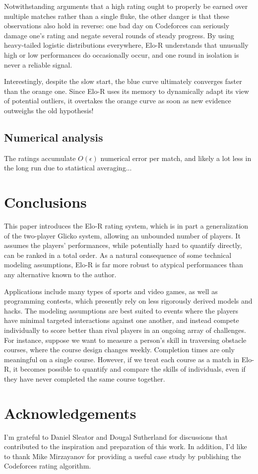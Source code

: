 \documentclass{article}
\begin{document}
Notwithstanding arguments that a high rating ought to properly be earned over multiple matches rather than a single fluke, the other danger is that these observations also hold in reverse: one bad day on Codeforces can seriously damage one's rating and negate several rounds of steady progress. By using heavy-tailed logistic distributions everywhere, Elo-R understands that unusually high or low performances do occasionally occur, and one round in isolation is never a reliable signal.

Interestingly, despite the slow start, the blue curve ultimately converges faster than the orange one. Since Elo-R uses its memory to dynamically adapt its view of potential outliers, it overtakes the orange curve as soon as new evidence outweighs the old hypothesis!

\subsection{Numerical analysis}

The ratings accumulate $O(\epsilon)$ numerical error per match, and likely a lot less in the long run due to statistical averaging...

\section{Conclusions}

This paper introduces the Elo-R rating system, which is in part a generalization of the two-player Glicko system, allowing an unbounded number of players. It assumes the players' performances, while potentially hard to quantify directly, can be ranked in a total order. As a natural consequence of some technical modeling assumptions, Elo-R is far more robust to atypical performances than any alternative known to the author.

Applications include many types of sports and video games, as well as programming contests, which presently rely on less rigorously derived models and hacks. The modeling assumptions are best suited to events where the players have minimal targeted interactions against one another, and instead compete individually to score better than rival players in an ongoing array of challenges. For instance, suppose we want to measure a person's skill in traversing obstacle courses, where the course design changes weekly. Completion times are only meaningful on a single course. However, if we treat each course as a match in Elo-R, it becomes possible to quantify and compare the skills of individuals, even if they have never completed the same course together.

\section*{Acknowledgements}

I'm grateful to Daniel Sleator and Dougal Sutherland for discussions that contributed to the inspiration and preparation of this work. In addition, I'd like to thank Mike Mirzayanov for providing a useful case study by publishing the Codeforces rating algorithm.



\end{document}
